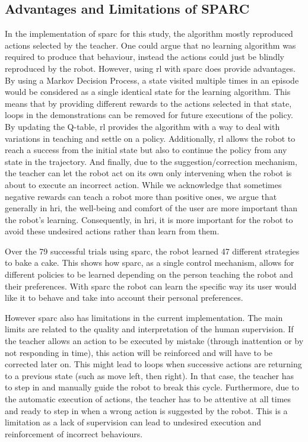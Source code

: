 \subsection{Advantages and Limitations of SPARC}

In the implementation of \gls{sparc} for this study, the algorithm mostly reproduced actions selected by the teacher. One could argue that no learning algorithm was required to produce that behaviour, instead the actions could just be blindly reproduced by the robot. However, using \gls{rl} with \gls{sparc} does provide advantages. By using a Markov Decision Process, a state visited multiple times in an episode would be considered as a single identical state for the learning algorithm. This means that by providing different rewards to the actions selected in that state, loops in the demonstrations can be removed for future executions of the policy. By updating the Q-table, \gls{rl} provides the algorithm with a way to deal with variations in teaching and settle on a policy. Additionally, \gls{rl} allows the robot to reach a success from the initial state but also to continue the policy from any state in the trajectory. And finally, due to the suggestion/correction mechanism, the teacher can let the robot act on its own only intervening when the robot is about to execute an incorrect action. While we acknowledge that sometimes negative rewards can teach a robot more than positive ones, we argue that generally in \gls{hri}, the well-being and comfort of the user are more important than the robot's learning. Consequently, in \gls{hri}, it is more important for the robot to avoid these undesired actions rather than learn from them.

Over the 79 successful trials using \gls{sparc}, the robot learned 47 different strategies to bake a cake. This shows how \gls{sparc}, as a single control mechanism, allows for different policies to be learned depending on the person teaching the robot and their preferences. With \gls{sparc} the robot can learn the specific way its user would like it to behave and take into account their personal preferences.

However \gls{sparc} also has limitations in the current implementation. The main limits are related to the quality and interpretation of the human supervision. If the teacher allows an action to be executed by mistake (through inattention or by not responding in time), this action will be reinforced and will have to be corrected later on. This might lead to loops when successive actions are returning to a previous state (such as move left, then right). In that case, the teacher has to step in and manually guide the robot to break this cycle. Furthermore, due to the automatic execution of actions, the teacher has to be attentive at all times and ready to step in when a wrong action is suggested by the robot. This is a limitation as a lack of supervision can lead to undesired execution and reinforcement of incorrect behaviours.

